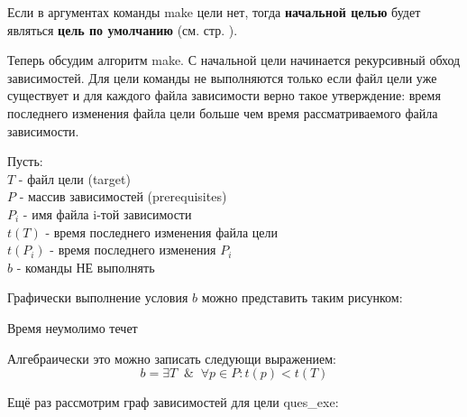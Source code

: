 Если в аргументах команды make цели нет, тогда \textbf{начальной целью} будет являться \textbf{цель по умолчанию} (см. стр. \pageref{default_target_def}).

Теперь обсудим алгоритм make. С начальной цели начинается рекурсивный обход зависимостей. Для цели команды не выполняются только если файл цели уже существует и для каждого файла зависимости верно такое утверждение: время последнего изменения файла цели больше чем время рассматриваемого файла зависимости.

Пусть: \\
$T$ - файл цели (target) \\
$P$ - массив зависимостей (prerequisites) \\
$P_i$ - имя файла i-той зависимости \\
$t(T)$ - время последнего изменения файла цели \\
$t(P_i)$ - время последнего изменения $P_i$ \\
$b$ - команды НЕ выполнять

Графически выполнение условия $b$ можно представить таким рисунком:

\vspace{0.2cm}


Время неумолимо течет

Алгебраически это можно записать следующи выражением:
$$ b = \exists T \;\; \& \;\; \forall p \in P : t(p) < t(T) $$

Ещё раз рассмотрим граф зависимостей для цели ques\_exe:


